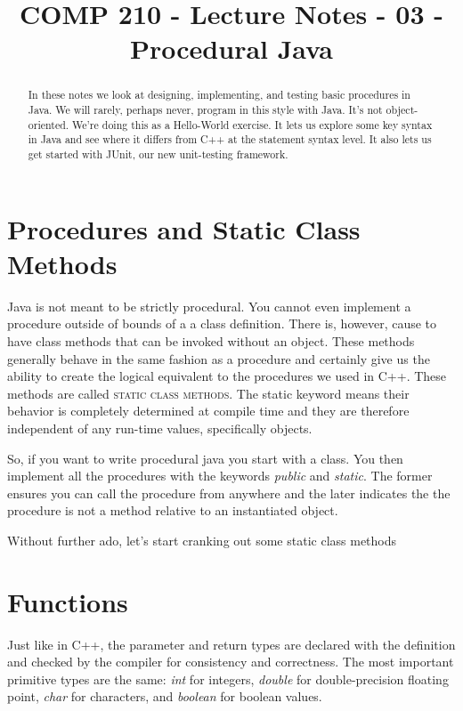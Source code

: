 \documentclass[]{tufte-handout}
\title{COMP 210 - Lecture Notes - 03 - Procedural Java}
\begin{document}
\maketitle

\begin{abstract}
In these notes we look at designing, implementing, and testing basic procedures in Java. We will rarely, perhaps never, program in this style with Java. It's not object-oriented. We're doing this as a Hello-World exercise. It lets us explore some key syntax in Java and see where it differs from C++ at the statement syntax level. It also lets us get started with JUnit, our new unit-testing framework. 
\end{abstract}

\section{Procedures and Static Class Methods}

Java is not meant to be strictly procedural. You cannot even implement a procedure outside of bounds of a a class definition. There is, however, cause to have class methods that can be invoked without an object. These methods generally behave in the same fashion as a procedure and certainly give us the ability to create the logical equivalent to the procedures we used in C++. These methods are called \textsc{static class methods}. The static keyword means their behavior is completely determined at compile time and they are therefore independent of any run-time values, specifically objects.    

So, if you want to write procedural java you start with a class. You then implement all the procedures with the keywords \textit{public} and \textit{static}. The former ensures you can call the procedure from anywhere and the later indicates the the procedure is not a method relative to an instantiated object. 

Without further ado, let's start cranking out some static class methods

\section{Functions}

Just like in C++, the parameter and return types are declared with the definition and checked by the compiler for consistency and correctness. The most important primitive types are the same: \textit{int} for integers, \textit{double} for double-precision floating point, \textit{char} for characters, and \textit{boolean} for boolean values. 
\end{document}
